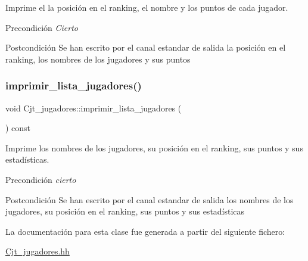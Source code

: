 Imprime el la posición en el ranking, el nombre y los puntos de cada jugador. 

\begin{DoxyPrecond}{Precondición}
{\itshape Cierto} 
\end{DoxyPrecond}
\begin{DoxyPostcond}{Postcondición}
Se han escrito por el canal estandar de salida la posición en el ranking, los nombres de los jugadores y sus puntos 
\end{DoxyPostcond}
\mbox{\label{class_cjt__jugadores_aeeb65f2beec6cac01abf0135b37dd104}} 
\subsubsection{\texorpdfstring{imprimir\+\_\+lista\+\_\+jugadores()}{imprimir\_lista\_jugadores()}}
{\footnotesize\ttfamily void Cjt\+\_\+jugadores\+::imprimir\+\_\+lista\+\_\+jugadores (\begin{DoxyParamCaption}{ }\end{DoxyParamCaption}) const}



Imprime los nombres de los jugadores, su posición en el ranking, sus puntos y sus estadísticas. 

\begin{DoxyPrecond}{Precondición}
{\itshape cierto} 
\end{DoxyPrecond}
\begin{DoxyPostcond}{Postcondición}
Se han escrito por el canal estandar de salida los nombres de los jugadores, su posición en el ranking, sus puntos y sus estadísticas 
\end{DoxyPostcond}


La documentación para esta clase fue generada a partir del siguiente fichero\+:\begin{DoxyCompactItemize}
\item 
\hyperlink{_cjt__jugadores_8hh}{Cjt\+\_\+jugadores.\+hh}\end{DoxyCompactItemize}
